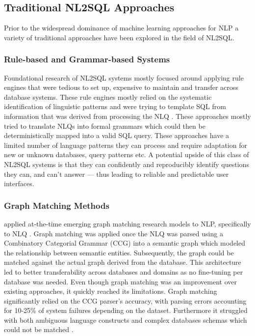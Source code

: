 \subsection{Traditional NL2SQL Approaches}

Prior to the widespread dominance of machine learning approaches for NLP
a variety of traditional approaches have been explored in the field of NL2SQL.

\subsubsection{Rule-based and Grammar-based Systems}

Foundational research of NL2SQL systems mostly focused around applying rule
engines that were tedious to set up, expensive to maintain and transfer
across database systems. These rule engines mostly relied on the systematic
identification of linguistic patterns and were trying to template SQL from
information that was derived from processing the NLQ \citep{Rendezvous, Lunar,
Ladder}. These approaches mostly tried to translate NLQs into formal grammars
which could then be deterministically mapped into a valid SQL query.
These approaches have a limited number of language patterns they
can process and require adaptation for new or unknown databases, query patterns
etc. A potential upside of this class of NL2SQL systems is that they can
confidently and reproducibly identify questions they can, and can't answer —
thus leading to reliable and predictable user interfaces.

\subsubsection{Graph Matching Methods}

\citeauthor{GraphMatching} applied at-the-time emerging graph matching research
models to NLP, specifically to NLQ \citep{GraphMatching}. Graph matching was
applied once the NLQ was parsed using a Combinatory Categorial Grammar (CCG)
into a semantic graph which modeled the relationship between semantic entities.
Subsequently, the graph could be matched against the actual graph derived from
the database. This architecture led to better transferability across databases
and domains as no fine-tuning per database was needed. Even though graph
matching was an improvement over existing approaches, it quickly reached its
limitations. Graph matching significantly relied on the CCG parser's accuracy,
with parsing errors accounting for 10-25\% of system failures depending on the
dataset. Furthermore it struggled with both ambiguous language constructs and
complex databases schemas which could not be matched
\citep[p.~387]{GraphMatching}.

